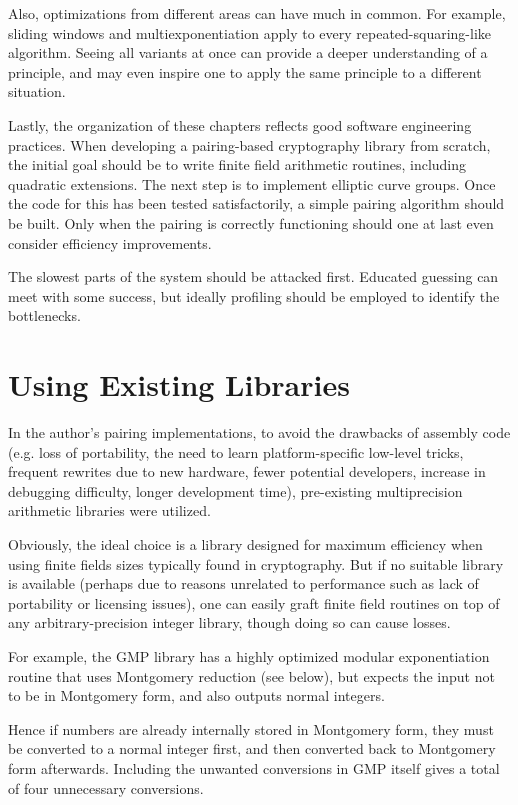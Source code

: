 Also, optimizations from different areas can have much in common. For example,
sliding windows and multiexponentiation apply to every repeated-squaring-like
algorithm. Seeing all variants at once can provide a deeper understanding of
a principle, and may even inspire one to apply the same principle to a
different situation.

Lastly, the organization of these chapters reflects good software
engineering practices. When developing a pairing-based cryptography
library from scratch,
the initial goal should be to write finite field arithmetic
routines, including
quadratic extensions. The next
step is to implement elliptic curve groups.
Once the code for this has been tested satisfactorily, a simple
pairing algorithm should be built.
Only when the pairing is correctly functioning
should one at last even consider efficiency improvements.

The slowest parts of the system should be attacked first.
Educated guessing can meet with some success, but
ideally profiling should be employed to identify the
bottlenecks.

\section{Using Existing Libraries}

In the author's pairing implementations, to avoid the drawbacks
of assembly code (e.g. loss of portability, the need to learn platform-specific
low-level tricks, frequent rewrites due to new hardware,
fewer potential developers, increase in debugging difficulty, longer
development time),
pre-existing multiprecision arithmetic libraries
were utilized.

Obviously, the ideal choice is
a library designed for maximum efficiency when using finite
fields sizes typically found in cryptography.
But if no suitable library is available (perhaps due to reasons unrelated
to performance such as lack of portability or licensing issues),
one can easily graft finite field routines on top of
any arbitrary-precision integer library, though doing so can cause losses.

For example, the GMP library has a highly optimized modular exponentiation
routine that uses Montgomery reduction (see below),
but expects the input not to be
in Montgomery form, and also outputs normal integers.

Hence if numbers are already internally stored in Montgomery form,
they must be converted to a normal integer first, and then converted
back to Montgomery form afterwards. Including the unwanted conversions in
GMP itself gives a total of four unnecessary conversions.

